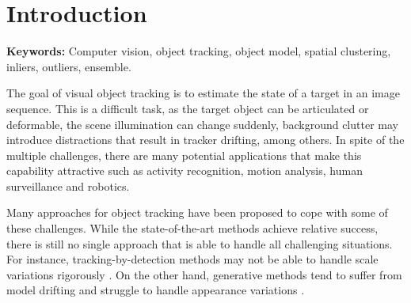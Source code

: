 
\chapter{Introduction} %

\label{chapter::introduction} 


\textbf{Keywords: }Computer vision, object tracking, object model, spatial
clustering, inliers, outliers, ensemble.

The goal of visual object tracking is to estimate the state of a target in an
image sequence.
This is a difficult task, as the target object can be articulated or
deformable, the scene illumination can change suddenly, background
clutter may introduce distractions that result in tracker drifting,
among others. In spite of the multiple challenges, there are many potential
applications that make this capability attractive such as
activity recognition, motion analysis, human surveillance and robotics.

Many approaches for object tracking have been proposed to cope with some of
these challenges.
While the state-of-the-art methods achieve relative success,
there is still no single approach that is able to handle all challenging
situations.
For instance, tracking-by-detection methods may not be able to handle scale
variations rigorously \cite{zhang2014meem}.
On the other hand, generative methods tend to suffer from model drifting and
struggle to handle appearance variations \cite{Zhang2012b}.

